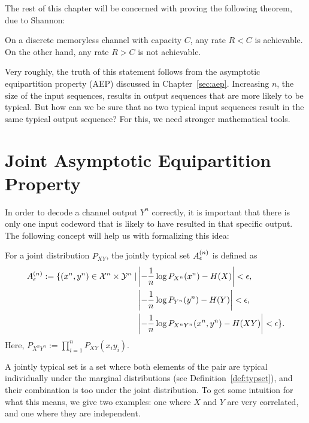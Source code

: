The rest of this chapter will be concerned with proving the following theorem, due to Shannon:

\begin{theorem}\label{thm:ncc}
On a discrete memoryless channel with capacity $C$, any rate $R < C$ is achievable. On the other hand, any rate $R > C$ is not achievable.
\end{theorem}

Very roughly, the truth of this statement follows from the asymptotic equipartition property (AEP) discussed in Chapter~\ref{sec:aep}. Increasing $n$, the size of the input sequences, results in output sequences that are more likely to be typical. But how can we be sure that no two typical input sequences result in the same typical output sequence? For this, we need stronger mathematical tools.

\section{Joint Asymptotic Equipartition Property}
In order to decode a channel output $Y^n$ correctly, it is important that there is only one input codeword that is likely to have resulted in that specific output. The following concept will help us with formalizing this idea:

\begin{definition}\label{def:joint-typicality}
For a joint distribution $P_{XY}$, the jointly typical set $A_{\epsilon}^{(n)}$ is defined as
\begin{align*}
A_{\epsilon}^{(n)} := \{(x^n,y^n) \in \mathcal{X}^n \times \mathcal{Y}^n \mid &\left| - \frac{1}{n} \log P_{X^n}(x^n) - H(X)\right| < \epsilon,\\
&\left| - \frac{1}{n} \log P_{Y^n}(y^n) - H(Y)\right| < \epsilon,\\
&\left| - \frac{1}{n} \log P_{X^nY^n}(x^n,y^n) - H(XY)\right| < \epsilon\}.
\end{align*}
Here, $P_{X^nY^n} := \prod_{i=1}^nP_{XY}(x_iy_i)$.
\end{definition}
A jointly typical set is a set where both elements of the pair are typical individually under the marginal distributions (see Definition~\ref{def:typset}), and their combination is too under the joint distribution. To get some intuition for what this means, we give two examples: one where $X$ and $Y$ are very correlated, and one where they are independent.



